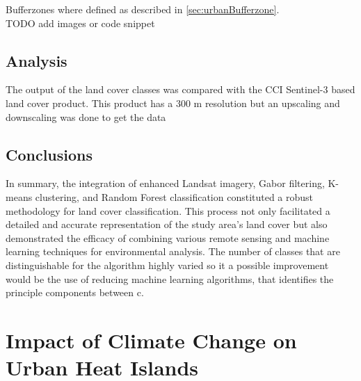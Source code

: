 \documentclass[12pt,a4paper, english,twoside]{article}
\begin{document}
      Bufferzones where defined as described in \cref{sec:urbanBufferzone}.\\
      TODO add images or code snippet
 \subsection{Analysis}\label{sec:landcoverAnalysis} 
  The output of the land cover classes was compared with the CCI Sentinel-3 based land cover product. This product has a 300 m resolution but an upscaling and downscaling was done to get the data

 \subsection{Conclusions}
    In summary, the integration of enhanced Landsat imagery, Gabor filtering, K-means clustering, and Random Forest classification constituted a robust methodology for land cover classification.
    This process not only facilitated a detailed and accurate representation of the study area's land cover but also demonstrated the efficacy of combining various remote sensing and machine learning techniques for environmental analysis.
    The number of classes that are distinguishable for the algorithm highly varied so it a possible improvement would be the use of reducing machine learning algorithms, that identifies the principle components between c.
  \newpage
  \section{Impact of Climate Change on Urban Heat Islands}\label{sec:UHITempImp}
\end{document}

